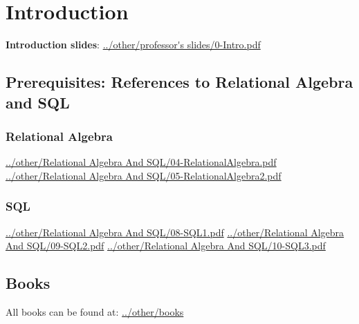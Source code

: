 \section{Introduction}
\textbf{Introduction slides}:\newline
\url{../other/professor's slides/0-Intro.pdf}
\subsection{Prerequisites: References to Relational Algebra and SQL}
\subsubsection{Relational Algebra}
\url{../other/Relational Algebra And SQL/04-RelationalAlgebra.pdf}\newline
\newline
\url{../other/Relational Algebra And SQL/05-RelationalAlgebra2.pdf}
\subsubsection{SQL}
\url{../other/Relational Algebra And SQL/08-SQL1.pdf}\newline
\newline
\url{../other/Relational Algebra And SQL/09-SQL2.pdf}\newline
\newline
\url{../other/Relational Algebra And SQL/10-SQL3.pdf}
\subsection{Books}
All books can be found at:\newline
\url{../other/books}\newline
\newline